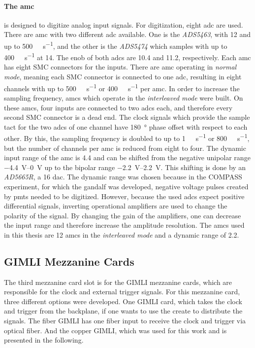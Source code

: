 \paragraph{The \ac{amc}} is designed to digitize analog input signals.
For digitization, eight \ac{adc} are used.
There are \ac{amc} with two different \ac{adc} available.
One is the \textit{ADS5463}, with \SI{12}{\bit} and up to \SI{500}{\mega\sample\per\second}, and the other is the \textit{ADS5474} which samples with up to \SI{400}{\mega\sample\per\second} at \SI{14}{\bit}.
The \ac{enob} of both \acp{adc} are \SI{10.4}{\bit} and \SI{11.2}{\bit}, respectively.
Each \ac{amc} has eight SMC connectors for the inputs.
There are \ac{amc} operating in \textit{normal mode}, meaning each SMC connector is connected to one \ac{adc}, resulting in eight channels with up to \SI{500}{\mega\sample\per\second} or \SI{400}{\mega\sample\per\second} per \ac{amc}.
In order to increase the sampling frequency, \acp{amc} which operate in the \textit{interleaved mode} were built.
On these \acp{amc}, four inputs are connected to two \ac{adc}s each, and therefore every second SMC connector is a dead end.
The clock signals which provide the sample tact for the two \acp{adc} of one channel have \SI{180}{\degree} phase offset with respect to each other.
By this, the sampling frequency is doubled to up to \SI{1}{\giga\sample\per\second} or \SI{800}{\mega\sample\per\second}, but the number of channels per \ac{amc} is reduced from eight to four.
The dynamic input range of the \ac{amc} is \SI{4.4}{\vpp} and can be shifted from the negative unipolar range \SIrange{-4.4}{0}{\volt} up to the bipolar range \SIrange{-2.2}{2.2}{\volt}.
This shifting is done by an \textit{AD5665R}, a \SI{16}{\bit} \ac{dac}.
The dynamic range was chosen because in the COMPASS experiment, for which the \ac{gandalf} was developed, negative voltage pulses created by \acp{pmt} needed to be digitized.
However, because the used \acp{adc} expect positive differential signals, inverting operational amplifiers are used to change the polarity of the signal.
By changing the gain of the amplifiers, one can decrease the input range and therefore increase the amplitude resolution.
The \acp{amc} used in this thesis are \SI{12}{\bit} \acp{amc} in the \textit{interleaved mode} and a dynamic range of \SI{2.2}{\vpp}.


\subsection{GIMLI Mezzanine Cards}
The third mezzanine card slot is for the GIMLI mezzanine cards, which are responsible for the clock and external trigger signals.
For this mezzanine card, three different options were developed.
One GIMLI card, which takes the clock and trigger from the backplane, if one wants to use the create to distribute the signals.
The fiber GIMLI has one fiber input to receive the clock and trigger via optical fiber.
And the copper GIMLI, which was used for this work and is presented in the following.

